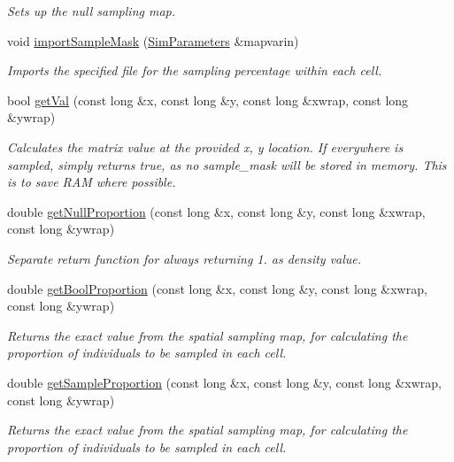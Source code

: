 \begin{DoxyCompactItemize}
\begin{DoxyCompactList}\small\item\em Sets up the null sampling map. \end{DoxyCompactList}\item 
void \hyperlink{class_data_mask_ac756e21b1c8d9412d565fb020eec9a06}{import\+Sample\+Mask} (\hyperlink{struct_sim_parameters}{Sim\+Parameters} \&mapvarin)
\begin{DoxyCompactList}\small\item\em Imports the specified file for the sampling percentage within each cell. \end{DoxyCompactList}\item 
bool \hyperlink{class_data_mask_ace6578db5b096b0c24112cc438cfa90d}{get\+Val} (const long \&x, const long \&y, const long \&xwrap, const long \&ywrap)
\begin{DoxyCompactList}\small\item\em Calculates the matrix value at the provided x, y location. If everywhere is sampled, simply returns true, as no sample\+\_\+mask will be stored in memory. This is to save R\+AM where possible. \end{DoxyCompactList}\item 
double \hyperlink{class_data_mask_af7a7cb35d309d37f42c7a3720a02b400}{get\+Null\+Proportion} (const long \&x, const long \&y, const long \&xwrap, const long \&ywrap)
\begin{DoxyCompactList}\small\item\em Separate return function for always returning 1. as density value. \end{DoxyCompactList}\item 
double \hyperlink{class_data_mask_a31cb42c363219967a7867340a7110e9f}{get\+Bool\+Proportion} (const long \&x, const long \&y, const long \&xwrap, const long \&ywrap)
\begin{DoxyCompactList}\small\item\em Returns the exact value from the spatial sampling map, for calculating the proportion of individuals to be sampled in each cell. \end{DoxyCompactList}\item 
double \hyperlink{class_data_mask_a682324892b67910b1dd2fa86a98c0873}{get\+Sample\+Proportion} (const long \&x, const long \&y, const long \&xwrap, const long \&ywrap)
\begin{DoxyCompactList}\small\item\em Returns the exact value from the spatial sampling map, for calculating the proportion of individuals to be sampled in each cell. \end{DoxyCompactList}\item 

\end{DoxyCompactItemize}
